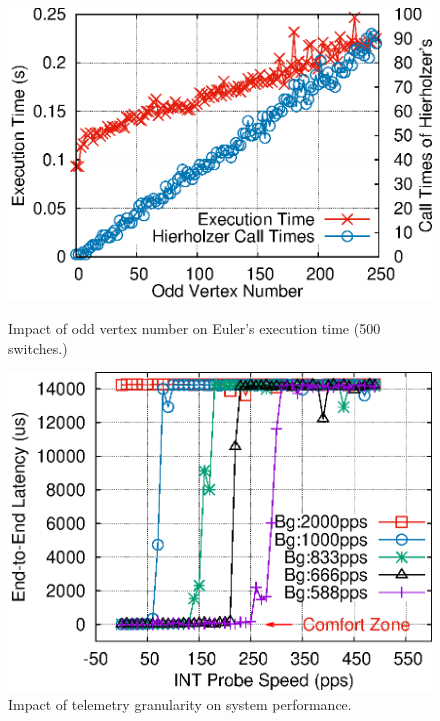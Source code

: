 \begin{figure}[htbp]
					\vspace{-0.0cm} \includegraphics[width=\linewidth]{figure/odd.eps}
					  \center
					  \vspace{0.0cm}
					  \caption{Impact of odd vertex number on Euler's execution time (500 switches.)}\label{fig:odd}
					\endminipage\hfill
					\vspace{-0.0cm} \includegraphics[width=\linewidth]{figure/impact.eps}
					  \center
					  \vspace{0.0cm}
					  \caption{Impact of telemetry granularity on system performance.}\label{fig:impact}
					\endminipage
					 
\vspace{-0.55cm}
\end{figure}

